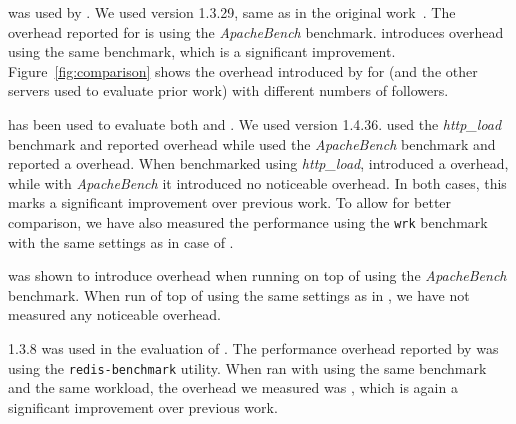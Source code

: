 \boldtext{\httpd} %
was used by \orchestra.  We used version 1.3.29, same as in the
original work~\cite{orchestra09}.  The overhead reported for
\orchestra is \orchestraHttpd using the \emph{ApacheBench}
benchmark. \varan introduces \httpdAbOneFollower overhead using the same
benchmark, which is a significant improvement.
Figure~\ref{fig:comparison} shows the overhead introduced by \varan for
\httpd (and the other servers used to evaluate prior work) with
different numbers of followers. 


\boldtext{\lighttpd} %
has been used to evaluate both \mx and \tachyon.  We used version
1.4.36. %
\mx used the \emph{http\_load} benchmark and reported \mxLighttpd overhead
while \tachyon used the \emph{ApacheBench} benchmark and reported a
\tachyonLighttpd overhead.  When benchmarked using \emph{http\_load},
\varan introduced a \lighttpdHttploadOneFollower overhead, while with
\emph{ApacheBench} it introduced no noticeable
overhead. %
In both
cases, this marks a significant improvement over previous work. To allow for
better comparison, we have also measured the performance using the
\lstinline`wrk` benchmark with the same settings as in case of \lighttpdtwo.

\boldtext{\thttpd} %
was shown to introduce \tachyonThttpd overhead when running on top of \tachyon using
the \emph{ApacheBench} benchmark. When run of top of \varan using the same settings
as in \cite{tachyon12}, we have not measured any noticeable overhead.

\boldtext{\redis} 1.3.8 %
was used in the evaluation of \mx.  The performance
overhead reported by \mx was \mxRedis using the \lstinline`redis-benchmark`
utility. When ran with \varan using the same benchmark and the same workload,
the overhead we measured was \redisOneFollower, which is again a significant
improvement over previous work.



